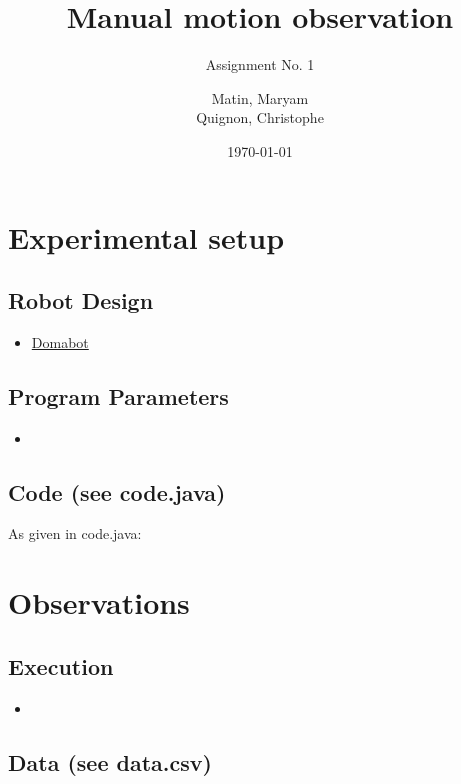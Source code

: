 \documentclass{scrartcl}
\begin{document}
\title{Manual motion observation}
\subtitle{Assignment No. 1}
\author{
  Matin, Maryam \\
  Quignon, Christophe
} 
\date{\today}


\maketitle



\section{Experimental setup}
\subsection{Robot Design}
\begin{itemize}
\item \href{http://www.damienkee.com/home/2011/8/20/domabot-classroom-robot-design.html}{Domabot}
\end{itemize}


\subsection{Program Parameters}
\begin{itemize}
\item
\end{itemize}


\subsection{Code (see code.java)}
As given in code.java:



\section{Observations}
\subsection{Execution}
\begin{itemize}
\item
\end{itemize}


\subsection{Data (see data.csv)}
\end{document}
